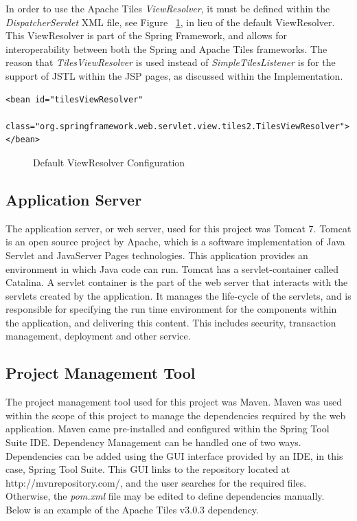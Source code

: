In order to use the Apache Tiles \textit{ViewResolver}, it must be defined within the \textit{DispatcherServlet} XML file, see Figure ~\ref{fig:tilesViewRes}, in lieu of the default ViewResolver. This ViewResolver is part of the Spring Framework, and allows for interoperability between both the Spring and Apache Tiles frameworks. The reason that \textit{TilesViewResolver} is used instead of \textit{SimpleTilesListener} is for the support of JSTL within the JSP pages, as discussed within the Implementation.

\begin{lstlisting}
<bean id="tilesViewResolver"
	class="org.springframework.web.servlet.view.tiles2.TilesViewResolver">
</bean>
\end{lstlisting}
\begin{figure}[H]
\caption{Default ViewResolver Configuration}
\label{fig:tilesViewRes}
\end{figure}

\subsection{Application Server}

The application server, or web server, used for this project was Tomcat 7.  Tomcat is an open source project by Apache, which is a software implementation of Java Servlet and JavaServer Pages technologies. This application provides an environment in which Java code can run. Tomcat has a servlet-container called Catalina. A servlet container is the part of the web server that interacts with the servlets created by the application. It manages the life-cycle of the servlets, and is responsible for specifying the run time environment for the components within the application, and delivering this content. This includes security, transaction management, deployment and other service. 

\subsection{Project Management Tool}

The project management tool used for this project was Maven. Maven was used within the scope of this project to manage the dependencies required by the web application. Maven came pre-installed and configured within the Spring Tool Suite IDE. Dependency Management can be handled one of two ways. Dependencies can be added using the GUI interface provided by an IDE, in this case, Spring Tool Suite. This GUI links to the repository located at http://mvnrepository.com/, and the user searches for the required files. Otherwise, the \textit{pom.xml} file may be edited to define dependencies manually. Below is an example of the Apache Tiles v3.0.3 dependency.

